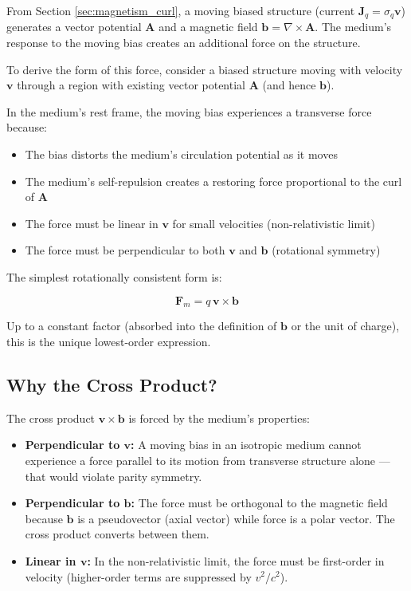 \documentclass[12pt, a4paper]{article}
\begin{document}
From Section \ref{sec:magnetism_curl}, a moving biased structure (current \( \mathbf{J}_q = \sigma_q \mathbf{v} \)) generates a vector potential \( \mathbf{A} \) and a magnetic field \( \mathbf{b} = \nabla \times \mathbf{A} \). The medium's response to the moving bias creates an additional force on the structure.

To derive the form of this force, consider a biased structure moving with velocity \( \mathbf{v} \) through a region with existing vector potential \( \mathbf{A} \) (and hence \( \mathbf{b} \)).

In the medium's rest frame, the moving bias experiences a transverse force because:
\begin{itemize}
    \item The bias distorts the medium's circulation potential as it moves
    \item The medium's self-repulsion creates a restoring force proportional to the curl of \( \mathbf{A} \)
    \item The force must be linear in \( \mathbf{v} \) for small velocities (non-relativistic limit)
    \item The force must be perpendicular to both \( \mathbf{v} \) and \( \mathbf{b} \) (rotational symmetry)
\end{itemize}

The simplest rotationally consistent form is:

\[
\mathbf{F}_m = q \, \mathbf{v} \times \mathbf{b}
\]

Up to a constant factor (absorbed into the definition of \( \mathbf{b} \) or the unit of charge), this is the unique lowest-order expression.

\subsection{Why the Cross Product?}
\label{subsec:why_cross_product}

The cross product \( \mathbf{v} \times \mathbf{b} \) is forced by the medium's properties:

\begin{itemize}
    \item \textbf{Perpendicular to \( \mathbf{v} \):} A moving bias in an isotropic medium cannot experience a force parallel to its motion from transverse structure alone — that would violate parity symmetry.
    
    \item \textbf{Perpendicular to \( \mathbf{b} \):} The force must be orthogonal to the magnetic field because \( \mathbf{b} \) is a pseudovector (axial vector) while force is a polar vector. The cross product converts between them.
    
    \item \textbf{Linear in \( \mathbf{v} \):} In the non-relativistic limit, the force must be first-order in velocity (higher-order terms are suppressed by \( v^2/c^2 \)).
\end{itemize}
\end{document}
